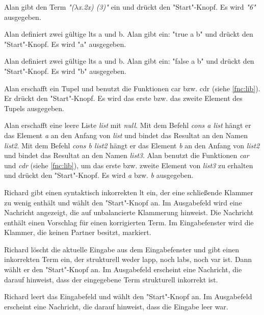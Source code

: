 \documentclass[parskip=full,11pt,twoside]{scrartcl}
\begin{document}
{Alan gibt den Term \emph{"($\lambda$x.2x) (3)"} ein und drückt den "Start"-Knopf.}
{Es wird \emph{"6"} ausgegeben.}

{Alan definiert zwei gültige \glspl{lt} a und b.
 Alan gibt ein: "true a b" und drückt den "Start"-Knopf.}
{Es wird "a" ausgegeben.}

{Alan definiert zwei gültige \glspl{lt} a und b.
 Alan gibt ein: "false a b" und drückt den "Start"-Knopf.}
{Es wird "b" ausgegeben.}

{Alan erschafft ein Tupel und benutzt die Funktionen car bzw. cdr (siehe \ref{fnc:lib}).
 Er drückt den "Start"-Knopf.}
{Es wird das erste bzw. das zweite Element des Tupels ausgegeben.}

{Alan erschafft eine leere Liste \emph{list} mit \emph{null}. 
 Mit dem Befehl \emph{cons a list} hängt er das Element \emph{a} an den Anfang von \emph{list} und bindet das Resultat
 an den Namen \emph{list2}.
 Mit dem Befehl \emph{cons b list2} hängt er das Element \emph{b} an den Anfang von \emph{list2} und bindet das
 Resultat an den Namen \emph{list3}.
 Alan benutzt die Funktionen \emph{car} und \emph{cdr} (siehe \ref{fnc:lib}), um das erste bzw. zweite Element von \emph{list3}
 zu erhalten
 und drückt den "Start"-Knopf.}
{Es wird \emph{a} bzw. \emph{b} ausgegeben.}


{Richard gibt einen syntaktisch inkorrekten \gls{lt} ein, der eine schließende Klammer
zu wenig enthält und wählt den "Start"-Knopf an.}
{Im Ausgabefeld wird eine Nachricht angezeigt, die auf unbalancierte Klammerung hinweist.
Die Nachricht enthält einen Vorschlag für einen korrigierten Term. Im Eingabefenster wird
die Klammer, die keinen Partner besitzt, markiert.}

{Richard löscht die aktuelle Eingabe aus dem Eingabefenster und gibt einen inkorrekten Term ein, der strukturell weder \gls{lapp}, noch
\gls{labs}, noch \gls{var} ist. Dann wählt er den "Start"-Knopf an.}
{Im Ausgabefeld erscheint eine Nachricht, die darauf hinweist, dass der eingegebene
Term strukturell inkorrekt ist.}

{Richard leert das Eingabefeld und wählt den "Start"-Knopf an.}
{Im Ausgabefeld erscheint eine Nachricht, die darauf hinweist, dass die Eingabe leer war.}
\end{document}
